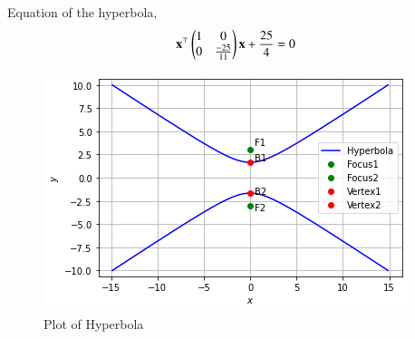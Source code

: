 Equation of the hyperbola,
\begin{align}
    \mathbf{x}^{\top}\begin{pmatrix}1&0\\0&\frac{-25}{11}\end{pmatrix}\mathbf{x}+\frac{25}{4}=0
\end{align}
\begin{figure}[h]
\centering
\includegraphics[width=\columnwidth]{solutions/oct/2/30/hyperbola_plot.png}
\caption{Plot of Hyperbola}
\label{oct/2/30/fig:hyperbola}
\end{figure}
